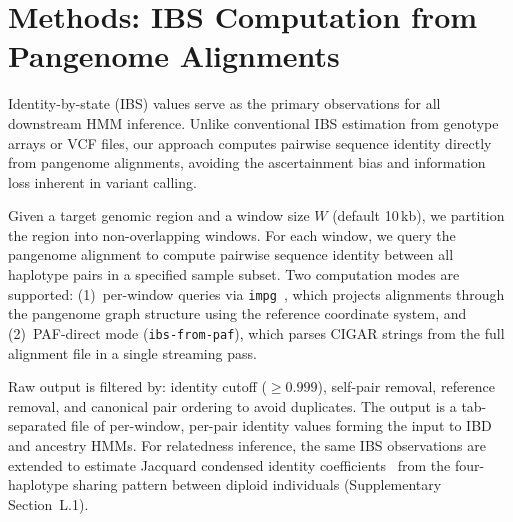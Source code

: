 \section{Methods: IBS Computation from Pangenome Alignments}
\label{sec:methods_ibs}

Identity-by-state (IBS) values serve as the primary observations for all downstream HMM inference. Unlike conventional IBS estimation from genotype arrays or VCF files, our approach computes pairwise sequence identity directly from pangenome alignments, avoiding the ascertainment bias and information loss inherent in variant calling.

Given a target genomic region and a window size $W$ (default 10\,kb), we partition the region into non-overlapping windows. For each window, we query the pangenome alignment to compute pairwise sequence identity between all haplotype pairs in a specified sample subset. Two computation modes are supported: (1)~per-window queries via \texttt{impg}~\cite{impg}, which projects alignments through the pangenome graph structure using the reference coordinate system, and (2)~PAF-direct mode (\texttt{ibs-from-paf}), which parses CIGAR strings from the full alignment file in a single streaming pass.

Raw output is filtered by: identity cutoff ($\geq 0.999$), self-pair removal, reference removal, and canonical pair ordering to avoid duplicates. The output is a tab-separated file of per-window, per-pair identity values forming the input to IBD and ancestry HMMs. For relatedness inference, the same IBS observations are extended to estimate Jacquard condensed identity coefficients~\cite{jacquard1974genetics} from the four-haplotype sharing pattern between diploid individuals (Supplementary Section~L.1).
